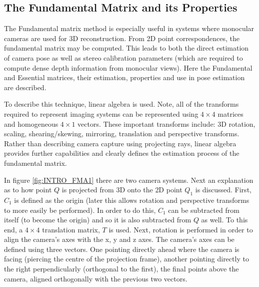 \subsection{The Fundamental Matrix and its Properties}

\label{FundamentalMatrixSection}

The Fundamental matrix method is especially useful in systems where monocular cameras are used for 3D reconstruction. From 2D point correspondences, the fundamental matrix may be computed. This leads to both the direct estimation of camera pose as well as stereo calibration parameters (which are required to compute dense depth information from monocular views). Here the Fundamental and Essential matrices, their estimation, properties and use in pose estimation are described.

To describe this technique, linear algebra is used. Note, all of the transforms required to represent imaging systems can be represented using $4 \times 4$ matrices and homogeneous $4 \times 1$ vectors. These important transforms include: 3D rotation, scaling, shearing/skewing, mirroring, translation and perspective transforms. Rather than describing camera capture using projecting rays, linear algebra provides further capabilities and clearly defines the estimation process of the fundamental matrix. 

In figure \ref{fig:INTRO_FMA1} there are two camera systems. Next an explanation as to how point $Q$ is projected from 3D onto the 2D point $Q_{1}$ is discussed. First, $C_{1}$ is defined as the origin (later this allows rotation and perspective transforms to more easily be performed). In order to do this, $C_{1}$ can be subtracted from itself (to become the origin) and so it is also subtracted from $Q$ as well. To this end, a $4 \times 4$ translation matrix, $T$ is used. Next, rotation is performed in order to align the camera's axes with the x, y and z axes. The camera's axes can be defined using three vectors. One pointing directly ahead where the camera is facing (piercing the centre of the projection frame), another pointing directly to the right perpendicularly (orthogonal to the first), the final points above the camera, aligned orthogonally with the previous two vectors. \\

